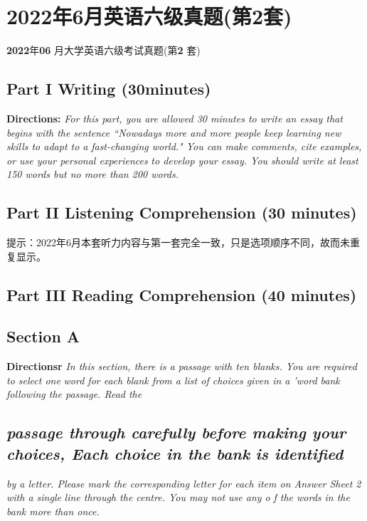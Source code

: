 \documentclass[UTF8,11pt]{ctexart}
\begin{document}
\section*{2022年6月英语六级真题(第2套)}
\textbf{2022}年\textbf{06} 月大学英语六级考试真题(第\textbf{2} 套)


\subsection*{\textbf{Part I} \textbf{Writing} \textbf{(30minutes)}}


\textbf{Directions: }\textit{For this part, you are allowed 30 minutes to write an essay that begins with the} \textit{sentence “Nowadays more and more people keep learning new skills to adapt to a} \textit{fast-changing world." You can make comments, cite examples, or use your personal experiences} \textit{to develop your essay. You should write at least 150 words but no more than 200 words.}


\subsection*{\textbf{Part II} \textbf{Listening Comprehension} \textbf{(30 minutes)}}


提示：2022年6月本套听力内容与第一套完全一致，只是选项顺序不同，故而未重复显示。


\subsection*{\textbf{Part III} \textbf{Reading Comprehension} \textbf{(40 minutes)}}


\subsection*{\textbf{Section A}}


\textbf{Directionsr }\textit{In this section, there is a passage with ten blanks. You are required to select one} \textit{word for each blank from a list of choices given in a 'word bank following the passage. Read the}


\subsection*{\textit{passage through carefully before making your choices, Each choice in the bank} \textit{is identified}}


\textit{by a letter. Please mark the corresponding letter for each item on Answer Sheet 2 with a single} \textit{line through the centre. You may not use any o} \textit{f the words in the bank more than once.}
\end{document}
